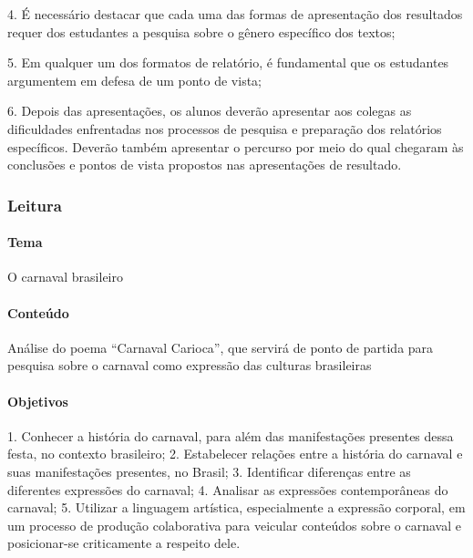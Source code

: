 \documentclass[11pt]{extarticle}
\begin{document}
4. É necessário destacar que cada uma das formas de apresentação dos
resultados requer dos estudantes a pesquisa sobre o gênero específico
dos textos;

\vspace{3mm}

5. Em qualquer um dos formatos de relatório, é fundamental que os
estudantes argumentem em defesa de um ponto de vista;

\vspace{3mm}

6. Depois das apresentações, os alunos deverão apresentar aos colegas as
dificuldades enfrentadas nos processos de pesquisa e preparação dos
relatórios específicos. Deverão também apresentar o percurso por meio do
qual chegaram às conclusões e pontos de vista propostos nas
apresentações de resultado.

\subsubsection{Leitura}



\paragraph{Tema} O carnaval brasileiro

\paragraph{Conteúdo} Análise do poema ``Carnaval Carioca'', que servirá de
ponto de partida para pesquisa sobre o carnaval como expressão das
culturas brasileiras

\paragraph{Objetivos} 1. Conhecer a história do carnaval, para além das
manifestações presentes dessa festa, no contexto brasileiro; 2.
Estabelecer relações entre a história do carnaval e suas manifestações
presentes, no Brasil; 3. Identificar diferenças entre as diferentes
expressões do carnaval; 4. Analisar as expressões contemporâneas do
carnaval; 5. Utilizar a linguagem artística, especialmente a expressão
corporal, em um processo de produção colaborativa para veicular
conteúdos sobre o carnaval e posicionar-se criticamente a respeito dele.
\end{document}
